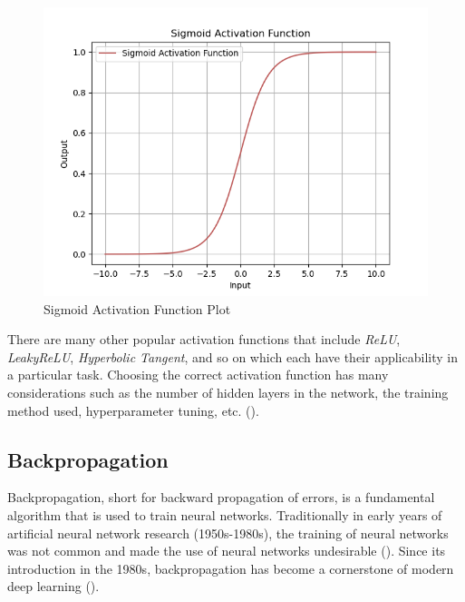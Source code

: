 \parbreak
\begin{figure}[H] %
    \centering %
    \includegraphics[width=\textwidth]{Figures/chapter_ne/ne_sigmoid_plot.png} %
    \caption{Sigmoid Activation Function Plot}
    \label{fig:ne_sigmoid_plot} %
\end{figure}

\noindent There are many other popular activation functions that include \textit{ReLU}, \textit{LeakyReLU}, \textit{Hyperbolic Tangent}, and so on which each have their applicability in a particular task. Choosing the correct activation function has many considerations such as the number of hidden layers in the network, the training method used, hyperparameter tuning, etc. (\cite{sharma2017activation}).

\subsection{Backpropagation}
Backpropagation, short for backward propagation of errors, is a fundamental algorithm that is used to train neural networks. Traditionally in early years of artificial neural network research (1950s-1980s), the training of neural networks was not common and made the use of neural networks undesirable (\cite{aggarwal2018neural}). Since its introduction in the 1980s, backpropagation has become a cornerstone of modern deep learning (\cite{aggarwal2018neural}).

